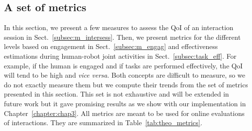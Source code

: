 \documentclass[a4paper,11pt,twoside]{StyleThese}
\begin{document}
\subsection{A set of metrics}\label{sec:metrics}

In this section, we present a few measures to assess the QoI of an interaction session in Sect.~\ref{subsec:m_intersess}. Then, we present metrics for the different levels based on engagement in Sect.~\ref{subsec:m_engag} and effectiveness estimations during human-robot joint activities in Sect.~\ref{subsec:task_eff}. For example, if the human is engaged and if tasks are performed effectively, the QoI will tend to be high and \textit{vice versa}. Both concepts are difficult to measure, so we do not exactly measure them but we compute their trends from the set of metrics presented in this section. This set is not exhaustive and will be extended in future work but it gave promising results as we show with our implementation in Chapter~\ref{chapter:chap3}. All metrics are meant to be used for online evaluations of interactions. They are summarized in Table~\ref{tab:theo_metrics}.
\end{document}
